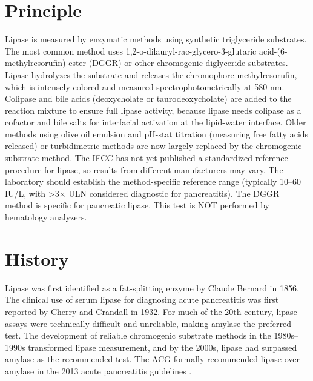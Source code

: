 \section*{Principle}
Lipase is measured by enzymatic methods using synthetic triglyceride substrates. The most common method uses 1,2-o-dilauryl-rac-glycero-3-glutaric acid-(6-methylresorufin) ester (DGGR) or other chromogenic diglyceride substrates. Lipase hydrolyzes the substrate and releases the chromophore methylresorufin, which is intensely colored and measured spectrophotometrically at 580 nm. Colipase and bile acids (deoxycholate or taurodeoxycholate) are added to the reaction mixture to ensure full lipase activity, because lipase needs colipase as a cofactor and bile salts for interfacial activation at the lipid-water interface. Older methods using olive oil emulsion and pH-stat titration (measuring free fatty acids released) or turbidimetric methods are now largely replaced by the chromogenic substrate method. The IFCC has not yet published a standardized reference procedure for lipase, so results from different manufacturers may vary. The laboratory should establish the method-specific reference range (typically 10--60 IU/L, with >3$\times$ ULN considered diagnostic for pancreatitis). The DGGR method is specific for pancreatic lipase. This test is NOT performed by hematology analyzers.

\section*{History}
Lipase was first identified as a fat-splitting enzyme by Claude Bernard in 1856. The clinical use of serum lipase for diagnosing acute pancreatitis was first reported by Cherry and Crandall in 1932. For much of the 20th century, lipase assays were technically difficult and unreliable, making amylase the preferred test. The development of reliable chromogenic substrate methods in the 1980s--1990s transformed lipase measurement, and by the 2000s, lipase had surpassed amylase as the recommended test. The ACG formally recommended lipase over amylase in the 2013 acute pancreatitis guidelines \cite{tenner2013american}.

